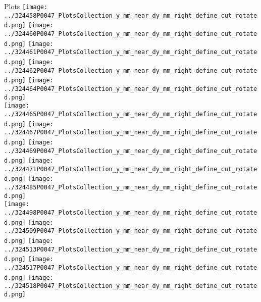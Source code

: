 \documentclass{beamer}
\begin{document}
\begin{frame}\tiny
        \begin{block}{Plots}
		  \centering
                \texttt{[image: ../324458P0047\_PlotsCollection\_y\_mm\_near\_dy\_mm\_right\_define\_cut\_rotated.png]}
                \texttt{[image: ../324460P0047\_PlotsCollection\_y\_mm\_near\_dy\_mm\_right\_define\_cut\_rotated.png]}
                \texttt{[image: ../324461P0047\_PlotsCollection\_y\_mm\_near\_dy\_mm\_right\_define\_cut\_rotated.png]}
                \texttt{[image: ../324462P0047\_PlotsCollection\_y\_mm\_near\_dy\_mm\_right\_define\_cut\_rotated.png]}
                \texttt{[image: ../324464P0047\_PlotsCollection\_y\_mm\_near\_dy\_mm\_right\_define\_cut\_rotated.png]}\\
                \texttt{[image: ../324465P0047\_PlotsCollection\_y\_mm\_near\_dy\_mm\_right\_define\_cut\_rotated.png]}
                \texttt{[image: ../324467P0047\_PlotsCollection\_y\_mm\_near\_dy\_mm\_right\_define\_cut\_rotated.png]}
                \texttt{[image: ../324469P0047\_PlotsCollection\_y\_mm\_near\_dy\_mm\_right\_define\_cut\_rotated.png]}
                \texttt{[image: ../324471P0047\_PlotsCollection\_y\_mm\_near\_dy\_mm\_right\_define\_cut\_rotated.png]}
                \texttt{[image: ../324485P0047\_PlotsCollection\_y\_mm\_near\_dy\_mm\_right\_define\_cut\_rotated.png]}\\
                \texttt{[image: ../324498P0047\_PlotsCollection\_y\_mm\_near\_dy\_mm\_right\_define\_cut\_rotated.png]}
                \texttt{[image: ../324509P0047\_PlotsCollection\_y\_mm\_near\_dy\_mm\_right\_define\_cut\_rotated.png]}
                \texttt{[image: ../324513P0047\_PlotsCollection\_y\_mm\_near\_dy\_mm\_right\_define\_cut\_rotated.png]}
                \texttt{[image: ../324517P0047\_PlotsCollection\_y\_mm\_near\_dy\_mm\_right\_define\_cut\_rotated.png]}
                \texttt{[image: ../324518P0047\_PlotsCollection\_y\_mm\_near\_dy\_mm\_right\_define\_cut\_rotated.png]}\\

\end{block}
\end{frame}
\end{document}
